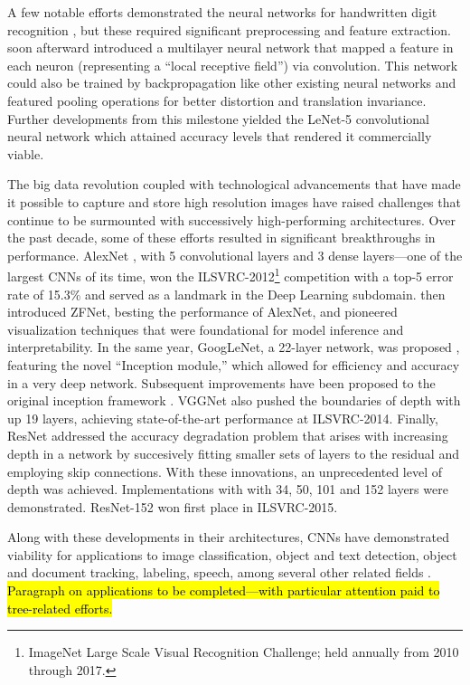 \documentclass[11pt,twoside]{article}
\numberwithin{equation}{section}
\newcommand{\?}{\stackrel{?}{=}}
\begin{document}
A few notable efforts demonstrated the neural networks for handwritten digit recognition
\cite{fukushima1988neocognitron,denker1988neural}, but these required significant preprocessing and feature
extraction. \cite{lecun1989handwritten} soon afterward introduced a multilayer neural network that mapped a feature in each neuron (representing a ``local receptive field'') via convolution. This network could also be trained by backpropagation like other existing neural networks and featured pooling operations for better distortion and
translation invariance. Further developments from this milestone yielded the LeNet-5 convolutional neural network which attained accuracy levels that rendered it commercially viable.

The big data revolution coupled with technological advancements that have made it possible to capture and store high resolution images have raised challenges that continue to be surmounted with successively high-performing
architectures. Over the past decade, some of these efforts resulted in significant breakthroughs in performance. AlexNet \cite{krizhevsky2012imageneta}, with 5 convolutional layers and 3 dense layers---one of the largest CNNs of its time, won the ILSVRC-2012\footnote{ImageNet Large Scale Visual Recognition Challenge; held annually from 2010 through 2017.} competition with a top-5 error rate of 15.3\% and served as a landmark in the Deep Learning subdomain. \citet{zeiler2014visualizing} then introduced ZFNet, besting the performance of AlexNet, and pioneered visualization techniques that were foundational for model inference and interpretability.  In the same year, GoogLeNet, a 22-layer network, was proposed \cite{szegedy2014going}, featuring the novel ``Inception module,'' which allowed for efficiency and accuracy in a very deep network. Subsequent improvements have been proposed to the original inception framework \cite{szegedy2015rethinking,szegedy2016inceptionv4}.  VGGNet \cite{simonyan2015very} also pushed the boundaries of depth with up 19 layers, achieving state-of-the-art performance at ILSVRC-2014. Finally, ResNet \cite{he2015deep} addressed the accuracy degradation problem that arises with increasing depth in a network by succesively fitting smaller sets of layers to the residual and employing skip connections. With these innovations, an unprecedented level of depth was achieved. Implementations with with 34, 50, 101 and 152 layers were demonstrated. ResNet-152 won first place in ILSVRC-2015.

Along with these developments in their architectures, CNNs have demonstrated viability for applications to image
classification, object and text detection, object and document tracking, labeling, speech, among several other related
fields \cite{gu2018recent}. \hl{Paragraph on applications to be completed---with particular attention paid to tree-related efforts.}
\end{document}
